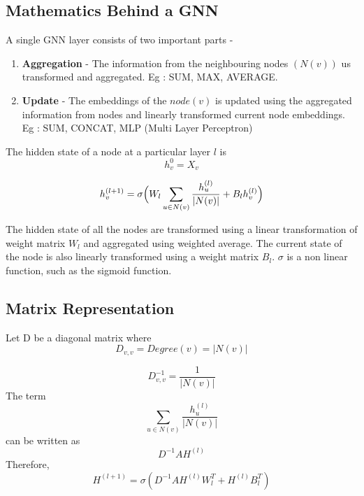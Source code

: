 \subsection{Mathematics Behind a GNN}
A single GNN layer consists of two important parts -
\begin{enumerate}
    \item \textbf{Aggregation} - The information from the neighbouring nodes $(N(v))$ us transformed and aggregated. Eg : SUM, MAX, AVERAGE.
    \item \textbf{Update} - The embeddings of the $node (v)$ is updated using the aggregated information from nodes and linearly transformed current node embeddings. Eg : SUM, CONCAT, MLP (Multi Layer Perceptron)
\end{enumerate}

The hidden state of a node at a particular layer $l$ is
\begin{displaymath}
    h_v^{0} = X_v
\end{displaymath}

\begin{displaymath}
    h_v^{(l+1)} = \sigma\Bigl(W_l\sum_{u\in N(v)}\frac{h_u^{(l)}}{|N(v)|} + B_lh_v^{(l)}\Bigr)
\end{displaymath}

The hidden state of all the nodes are transformed using a linear transformation of weight matrix $W_l$ and aggregated using weighted average. 
The current state of the node is also linearly transformed using a weight matrix $B_l$. $\sigma$ is a non linear function, such as the sigmoid function.


\subsection*{Matrix Representation}
Let D be a diagonal matrix where
\begin{displaymath}
   D_{v,v} = Degree(v) = |N(v)|
\end{displaymath}

\begin{displaymath}
    D_{v,v}^{-1} = \frac{1}{|N(v)|}
\end{displaymath}
The term
\begin{displaymath}
    \sum_{u\in N(v)}\frac{h_u^{(l)}}{|N(v)|}
\end{displaymath} 
can be written as
\begin{displaymath}
    D^{-1}AH^{(l)}
\end{displaymath}
Therefore, 
\begin{displaymath}
H^{(l+1)} = \sigma(D^{-1}AH^{(l)}W_l^T + H^{(l)}B_l^T)    
\end{displaymath}

